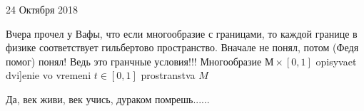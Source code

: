 

   24 Октября 2018

  Вчера прочел у Вафы, что если многообразие с границами,
то каждой границе в физике соответствует гильбертово пространство.
  Вначале не понял, потом (Федя помог) понял!
    Ведь это гранчные условия!!! Многообразие $М\times [0,1]$
 opisyvaet dvi]enie vo vremeni $t\in [0,1]$ prostranstva $M$

   Да, век живи, век учись, дураком помрешь......
  \bye

